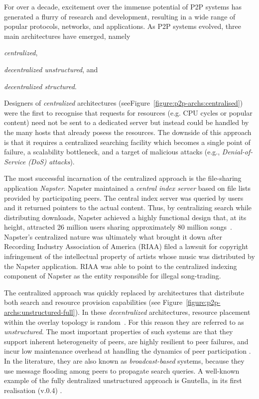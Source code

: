 For over a decade, excitement over the immense potential of P2P systems has
generated a flurry of research and development, resulting in a wide range of
popular protocols, networks, and applications. As P2P systems evolved, three
main architectures have emerged, namely
\begin{inparaenum}
  \item \emph{centralized},
  \item \emph{decentralized unstructured}, and
  \item \emph{decentralized structured}.
\end{inparaenum}

Designers of \emph{centralized} architectures
(seeFigure~\ref{figure:p2p-archs:centralised}) were the first to recognise that
requests for resources (e.g. CPU cycles or popular content) need
not be sent to a dedicated server but instead could be handled by
the many hosts that already posess the resources. The downside of this approach
is that it requires a centralized searching facility which becomes a single
point of failure, a scalability bottleneck, and a target of malicious attacks
(e.g., \emph{Denial-of-Service (DoS) attacks}).

The most successful incarnation of the centralized approach is the file-sharing
application \emph{Napster}. %
Napster maintained a \emph{central index server} based on file lists provided by
participating peers. The central index server was queried by users and it
returned pointers to the actual content. Thus, by centralizing search while
distributing downloads, Napster achieved a highly functional design that, at its
height, attracted 26 million users sharing approximately 80 million
songs~\cite{jmm_naptopusage_2001}. Napster's centralized nature was ultimately
what brought it down after Recording Industry Association of America (RIAA) 
filed a lawsuit for copyright infringement of the intellectual property of
artists whose music was distributed by the Napster application. RIAA was able to
point to the centralized indexing component of Napster as the entity responsible
for illegal song-trading.

The centralized approach was quickly replaced by architectures that distribute
both search and resource provision capabilities (see
Figure~\ref{figure:p2p-archs:unstructured-full}). In these \emph{decentralized}
architectures, resource placement within the overlay topology is
random~\cite{YG-M2002}. For this reason they are referred to as
\emph{unstructured}. The most important properties of such systems are that they
support inherent heterogeneity of peers, are highly resilient to peer failures,
and incur low maintenance overhead at handling the dynamics of peer
participation \cite{stutzbach_churn_2006}. In the literature, they are also
known as \emph{broadcast-based} systems, because they use message flooding among
peers to propagate search queries. A well-known example of the fully dentralized
unstructured approach is Gnutella, in its first realisation (v.0.4)
\cite{gnutellav04}.


